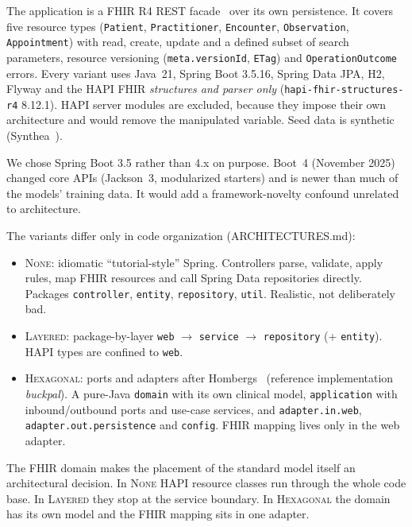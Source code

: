 \documentclass[10pt]{article}
\newcommand{\NONE}{\textsc{None}}
\newcommand{\LAY}{\textsc{Layered}}
\newcommand{\HEX}{\textsc{Hexagonal}}
\newcommand{\code}[1]{\texttt{#1}}
\begin{document}
The application is a FHIR R4 REST facade~\citep{hl7fhirr4} over its own persistence. It covers
five resource types (\code{Patient}, \code{Practitioner}, \code{Encounter}, \code{Observation},
\code{Appointment}) with read, create, update and a defined subset of search parameters, resource
versioning (\code{meta.versionId}, \code{ETag}) and \code{OperationOutcome} errors. Every variant
uses Java~21, Spring Boot 3.5.16, Spring Data JPA, H2, Flyway and the HAPI FHIR \emph{structures
and parser only} (\code{hapi-fhir-structures-r4} 8.12.1). HAPI server modules are excluded, because
they impose their own architecture and would remove the manipulated variable. Seed data is
synthetic (Synthea~\citep{walonoski2018synthea}).

We chose Spring Boot 3.5 rather than 4.x on purpose. Boot~4 (November 2025) changed core APIs
(Jackson~3, modularized starters) and is newer than much of the models' training data. It would
add a framework-novelty confound unrelated to architecture.

The variants differ only in code organization (ARCHITECTURES.md):
\begin{itemize}[itemsep=1pt]
  \item \NONE: idiomatic ``tutorial-style'' Spring. Controllers parse, validate, apply rules,
    map FHIR resources and call Spring Data repositories directly. Packages \code{controller},
    \code{entity}, \code{repository}, \code{util}. Realistic, not deliberately bad.
  \item \LAY: package-by-layer \code{web} $\rightarrow$ \code{service} $\rightarrow$
    \code{repository} (+ \code{entity}). HAPI types are confined to \code{web}.
  \item \HEX: ports and adapters after Hombergs~\citep{hombergs2023clean} (reference
    implementation \emph{buckpal}). A pure-Java \code{domain} with its own clinical model,
    \code{application} with inbound/outbound ports and use-case services, and
    \code{adapter.in.web}, \code{adapter.out.persistence} and \code{config}. FHIR mapping lives
    only in the web adapter.
\end{itemize}
The FHIR domain makes the placement of the standard model itself an architectural decision. In
\NONE{} HAPI resource classes run through the whole code base. In \LAY{} they stop at the service
boundary. In \HEX{} the domain has its own model and the FHIR mapping sits in one adapter.
\end{document}
